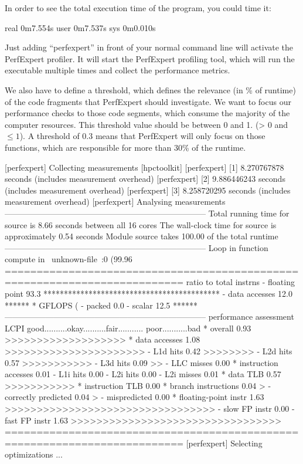 In order to see the total execution time of the program, you could time it:

\begin{prompt}
real 0m7.554s
user 0m7.537s
sys 0m0.010s
\end{prompt}

Just adding ``perfexpert'' in front of your normal command line will activate the PerfExpert profiler.  It will start the PerfExpert profiling tool, which will run the executable multiple times and collect the performance metrics.

We also have to define a threshold, which defines the relevance (in \% of runtime) of the code fragments that PerfExpert should investigate. We want to focus our performance checks to those code segments, which consume the majority of the computer resources.  This threshold value should be between 0 and 1. (> 0 and $\leq 1$).  A threshold of 0.3 means that PerfExpert will only focus on those functions, which are responsible for more than 30\% of the runtime.

\begin{prompt}
[perfexpert] Collecting measurements [hpctoolkit]
[perfexpert]    [1] 8.270767878 seconds (includes measurement overhead)
[perfexpert]    [2] 9.886446243 seconds (includes measurement overhead)
[perfexpert]    [3] 8.258720295 seconds (includes measurement overhead)
[perfexpert] Analysing measurements
--------------------------------------------------------------------------
Total running time for source is 8.66 seconds between all 16 cores
The wall-clock time for source is approximately 0.54 seconds
Module source takes 100.00 of the total runtime
--------------------------------------------------------------------------
Loop in function compute in ~unknown-file~:0 (99.96%
==========================================================================
ratio to total instrns     %
- floating point       93.3 *******************************************
- data accesses        12.0 ******
* GFLOPS (%
- packed                0.0
- scalar               12.5 ******
--------------------------------------------------------------------------
performance assessment LCPI good..........okay..........fair........... poor...........bad
* overall              0.93 >>>>>>>>>>>>>>>>>>>
* data accesses        1.08 >>>>>>>>>>>>>>>>>>>>>>
- L1d hits             0.42 >>>>>>>>
- L2d hits             0.57 >>>>>>>>>>>
- L3d hits             0.09 >>
- LLC misses           0.00
* instruction accesses 0.01
- L1i hits             0.00
- L2i hits             0.00
- L2i misses           0.01
* data TLB             0.57 >>>>>>>>>>>
* instruction TLB      0.00
* branch instructions  0.04 >
- correctly predicted  0.04 >
- mispredicted         0.00
* floating-point instr 1.63 >>>>>>>>>>>>>>>>>>>>>>>>>>>>>>>>>
- slow FP instr        0.00
- fast FP instr        1.63 >>>>>>>>>>>>>>>>>>>>>>>>>>>>>>>>>
==========================================================================
[perfexpert] Selecting optimizations
...
\end{prompt}

